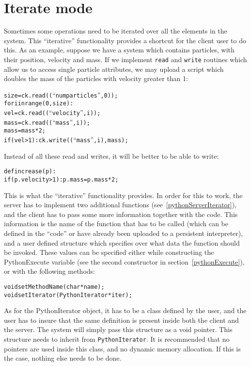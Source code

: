 \section{Iterate mode}
\label{pythonIterator}

Sometimes some operations need to be iterated over all the elements in the
system. This ``iterative'' functionality provides a shortcut for the client user
to do this. As an example, suppose we have a system which contains particles,
with their position, velocity and mass. If we implement \texttt{read} and
\texttt{write} routines which allow us to access single particle attributes, we may
upload a script which doubles the mass of the particles with velocity greater
than 1:

\begin{alltt}
size = ck.read((``numparticles'', 0));
for i in range(0, size):
    vel = ck.read((``velocity'', i));
    mass = ck.read((``mass'', i));
    mass = mass * 2;
    if (vel > 1): ck.write((``mass'', i), mass);
\end{alltt}

Instead of all these read and writes, it will be better to be able to write:

\begin{alltt}
def increase(p):
    if (p.velocity > 1): p.mass = p.mass * 2;
\end{alltt}

This is what the ``iterative'' functionality provides. In order for this to
work, the server has to implement two additional functions
(see~\ref{pythonServerIterator}), and the client has to pass some more
information together with the code. This information is the name of the function
that has to be called (which can be defined in the ``code'' or have already been
uploaded to a persistent interpreter), and a user defined structure which
specifies over what data the function should be invoked. These values can be
specified either while constructing the PythonExecute variable (see the second
constructor in section~\ref{pythonExecute}), or with the following methods:

\begin{alltt}
void setMethodName(char *name);
void setIterator(PythonIterator *iter);
\end{alltt}

As for the PythonIterator object, it has to be a class defined by the user, and
the user has to insure that the same definition is present inside both the
client and the server. The \charmpp{} system will simply pass this structure as
a void pointer. This structure needs to inherit from \texttt{PythonIterator}. It
is recommended that no pointers are used inside this class, and no dynamic
memory allocation. If this is the case, nothing else needs to be done.


